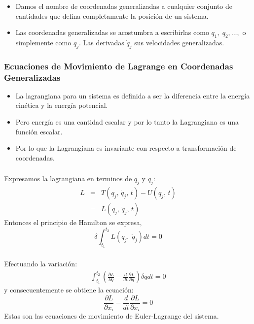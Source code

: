 \documentclass{beamer}
\begin{document}
%
\begin{frame}
\justifying
\frametitle{}
\begin{itemize}
\justifying
\item Damos el nombre de coordenadas generalizadas a cualquier conjunto de cantidades que defina completamente la posición de un sistema.
\item Las coordenadas generalizadas se acostumbra a escribirlas como $q_1, \; q_2,\ldots,$ o simplemente como $q_j$. Las derivadas $\dot{q}_j$ sus velocidades generalizadas.
\end{itemize}
\end{frame}
%
\begin{frame}
\justifying
\frametitle{Ecuaciones de Movimiento de Lagrange en Coordenadas Generalizadas}
\begin{itemize}
\justifying
\item La lagrangiana para un sistema es definida a ser la diferencia entre la energía cinética y la energía potencial.
\item Pero energía es una cantidad escalar y por lo tanto la Lagrangiana es una función escalar.
\item Por lo que la Lagrangiana es invariante con respecto a transformación de coordenadas.
\end{itemize}
\end{frame}
%
\begin{frame}
\justifying
\frametitle{}
 Expresamos la lagrangiana en terminos de $q_j$ y $\dot{q}_j$: 
\begin{eqnarray}
L &=& T(q_j, \, \dot{q}_j, \,t) - U(q_j,\,t) \nonumber \\
 &=& L(q_j, \, \dot{q}_j, \,t)
\end{eqnarray}
Entonces el principio de Hamilton se expresa,
\begin{equation}
\delta \int_{t_1}^{t_2} L(q_j, \;\dot{q}_j) dt =0 
\end{equation}
\end{frame}

\begin{frame}
\justifying
\frametitle{}
Efectuando la variación:
\begin{eqnarray}
\int_{t_1}^{t_2}\left( \frac{\partial L}{\partial q} - \frac{d}{dt} \frac{\partial L}{\partial \dot{q}} \right) \delta q dt =0 
\end{eqnarray}
y consecuentemente se obtiene la ecuación:
\begin{equation}
\frac{\partial L}{\partial x_i} - \frac{d}{dt} \frac{\partial L}{\partial \dot{x_i}} = 0
\end{equation}
Estas son las ecuaciones de movimiento de Euler-Lagrange del sistema. 
\end{frame}
\end{document}
